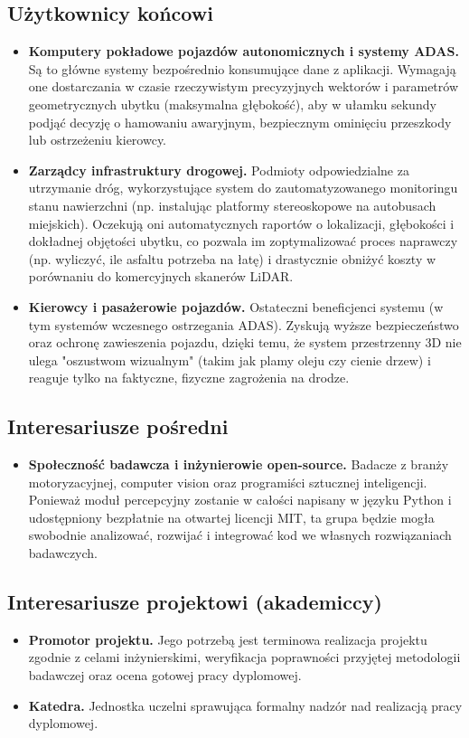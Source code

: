 \documentclass[11pt, a4paper]{article}
\begin{document}
\subsection{Użytkownicy końcowi}
\begin{itemize}
    \item \textbf{Komputery pokładowe pojazdów autonomicznych i systemy ADAS.} Są to główne systemy bezpośrednio konsumujące dane z aplikacji. Wymagają one dostarczania w czasie rzeczywistym precyzyjnych wektorów i parametrów geometrycznych ubytku (maksymalna głębokość), aby w ułamku sekundy podjąć decyzję o hamowaniu awaryjnym, bezpiecznym ominięciu przeszkody lub ostrzeżeniu kierowcy.
    \item \textbf{Zarządcy infrastruktury drogowej.} Podmioty odpowiedzialne za utrzymanie dróg, wykorzystujące system do zautomatyzowanego monitoringu stanu nawierzchni (np. instalując platformy stereoskopowe na autobusach miejskich). Oczekują oni automatycznych raportów o lokalizacji, głębokości i dokładnej objętości ubytku, co pozwala im zoptymalizować proces naprawczy (np. wyliczyć, ile asfaltu potrzeba na łatę) i drastycznie obniżyć koszty w porównaniu do komercyjnych skanerów LiDAR.
        \item \textbf{Kierowcy i pasażerowie pojazdów.} Ostateczni beneficjenci systemu (w tym systemów wczesnego ostrzegania ADAS). Zyskują wyższe bezpieczeństwo oraz ochronę zawieszenia pojazdu, dzięki temu, że system przestrzenny 3D nie ulega "oszustwom wizualnym" (takim jak plamy oleju czy cienie drzew) i reaguje tylko na faktyczne, fizyczne zagrożenia na drodze.
\end{itemize}

\subsection{Interesariusze pośredni}
\begin{itemize}
    \item \textbf{Społeczność badawcza i inżynierowie open-source.} Badacze z branży motoryzacyjnej, computer vision oraz programiści sztucznej inteligencji. Ponieważ moduł percepcyjny zostanie w całości napisany w języku Python i udostępniony bezpłatnie na otwartej licencji MIT, ta grupa będzie mogła swobodnie analizować, rozwijać i integrować kod we własnych rozwiązaniach badawczych.
\end{itemize}

\subsection{Interesariusze projektowi (akademiccy)}
\begin{itemize}
    \item \textbf{Promotor projektu.} Jego potrzebą jest terminowa realizacja projektu zgodnie z celami inżynierskimi, weryfikacja poprawności przyjętej metodologii badawczej oraz ocena gotowej pracy dyplomowej.
    \item \textbf{Katedra.} Jednostka uczelni sprawująca formalny nadzór nad realizacją pracy dyplomowej.
\end{itemize}
\end{document}

